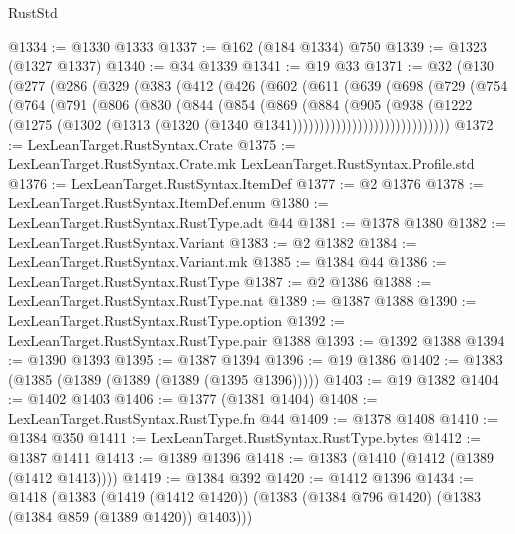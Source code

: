\begin{lexlean}{RustStd}
\begin{coremodule}
{{@1334 := @1330 @1333
@1337 := @162 (@184 @1334) @750
@1339 := @1323 (@1327 @1337)
@1340 := @34 @1339
@1341 := @19 @33
@1371 := @32
    (@130
      (@277
        (@286
          (@329
            (@383
              (@412
                (@426
                  (@602
                    (@611
                      (@639
                        (@698
                          (@729
                            (@754
                              (@764
                                (@791
                                  (@806
                                    (@830
                                      (@844
                                        (@854
                                          (@869
                                            (@884
                                              (@905
                                                (@938
                                                  (@1222
                                                    (@1275
                                                      (@1302
                                                        (@1313
                                                          (@1320
                                                            (@1340
                                                              @1341)))))))))))))))))))))))))))))
@1372 := LexLeanTarget.RustSyntax.Crate
@1375 := LexLeanTarget.RustSyntax.Crate.mk LexLeanTarget.RustSyntax.Profile.std
@1376 := LexLeanTarget.RustSyntax.ItemDef
@1377 := @2 @1376
@1378 := LexLeanTarget.RustSyntax.ItemDef.enum
@1380 := LexLeanTarget.RustSyntax.RustType.adt @44
@1381 := @1378 @1380
@1382 := LexLeanTarget.RustSyntax.Variant
@1383 := @2 @1382
@1384 := LexLeanTarget.RustSyntax.Variant.mk
@1385 := @1384 @44
@1386 := LexLeanTarget.RustSyntax.RustType
@1387 := @2 @1386
@1388 := LexLeanTarget.RustSyntax.RustType.nat
@1389 := @1387 @1388
@1390 := LexLeanTarget.RustSyntax.RustType.option
@1392 := LexLeanTarget.RustSyntax.RustType.pair @1388
@1393 := @1392 @1388
@1394 := @1390 @1393
@1395 := @1387 @1394
@1396 := @19 @1386
@1402 := @1383 (@1385 (@1389 (@1389 (@1389 (@1395 @1396)))))
@1403 := @19 @1382
@1404 := @1402 @1403
@1406 := @1377 (@1381 @1404)
@1408 := LexLeanTarget.RustSyntax.RustType.fn @44
@1409 := @1378 @1408
@1410 := @1384 @350
@1411 := LexLeanTarget.RustSyntax.RustType.bytes
@1412 := @1387 @1411
@1413 := @1389 @1396
@1418 := @1383 (@1410 (@1412 (@1389 (@1412 @1413))))
@1419 := @1384 @392
@1420 := @1412 @1396
@1434 := @1418
    (@1383
      (@1419 (@1412 @1420))
      (@1383 (@1384 @796 @1420) (@1383 (@1384 @859 (@1389 @1420)) @1403)))
}}
\end{coremodule}
\end{lexlean}
